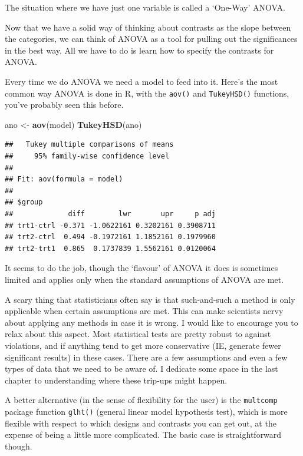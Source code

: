 \documentclass[
]{book}
\newenvironment{Shaded}{\begin{snugshade}}{\end{snugshade}}
\newcommand{\KeywordTok}[1]{\textcolor[rgb]{0.13,0.29,0.53}{\textbf{#1}}}
\newcommand{\NormalTok}[1]{#1}
\newcommand{\StringTok}[1]{\textcolor[rgb]{0.31,0.60,0.02}{#1}}
\newenvironment{sidenote}
{ \begin{tcolorbox}[colbacktitle=blue!50!white,
title=huh?,coltitle=white,
fonttitle=\bfseries] }
{  \end{tcolorbox} }
\begin{document}
The situation where we have just one variable is called a `One-Way' ANOVA.

Now that we have a solid way of thinking about contrasts as the slope between the categories, we can think of ANOVA as a tool for pulling out the significances in the best way. All we have to do is learn how to specify the contrasts for ANOVA.

Every time we do ANOVA we need a model to feed into it. Here's the most common way ANOVA is done in R, with the \texttt{aov()} and \texttt{TukeyHSD()} functions, you've probably seen this before.

\begin{Shaded}
\begin{Highlighting}[]
\NormalTok{ano <-}\StringTok{ }\KeywordTok{aov}\NormalTok{(model)}
\KeywordTok{TukeyHSD}\NormalTok{(ano)}
\end{Highlighting}
\end{Shaded}

\begin{verbatim}
##   Tukey multiple comparisons of means
##     95% family-wise confidence level
## 
## Fit: aov(formula = model)
## 
## $group
##             diff        lwr       upr     p adj
## trt1-ctrl -0.371 -1.0622161 0.3202161 0.3908711
## trt2-ctrl  0.494 -0.1972161 1.1852161 0.1979960
## trt2-trt1  0.865  0.1737839 1.5562161 0.0120064
\end{verbatim}

It seems to do the job, though the `flavour' of ANOVA it does is sometimes limited and applies only when the standard assumptions of ANOVA are met.

\begin{sidenote}
A scary thing that statisticians often say is that such-and-such a method is only applicable when certain assumptions are met. This can make scientists nervy about applying any methods in case it is wrong. I would like to encourage you to relax about this aspect. Most statistical tests are pretty robust to against violations, and if anything tend to get more conservative (IE, generate fewer significant results) in these cases. There are a few assumptions and even a few types of data that we need to be aware of. I dedicate some space in the last chapter to understanding where these trip-ups might happen.
\end{sidenote}

A better alternative (in the sense of flexibility for the user) is the \texttt{multcomp} package function \texttt{glht()} (general linear model hypothesis test), which is more flexible with respect to which designs and contrasts you can get out, at the expense of being a little more complicated. The basic case is straightforward though.
\end{document}
